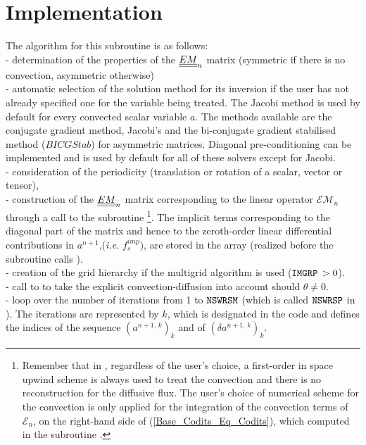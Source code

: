 \section*{Implementation}
The algorithm for this subroutine is as follows:\\
- determination of the properties of the $\underline{\underline{EM}}_{n}$ matrix (symmetric
if there is no convection, asymmetric otherwise)\\
- automatic selection of the solution method for its inversion if the user has not already
specified one for the variable being treated. The Jacobi method is used by default for every convected scalar variable $a$. The  methods available are the conjugate gradient method, Jacobi's and the
bi-conjugate gradient stabilised method ($BICGStab$) for asymmetric matrices.  Diagonal pre-conditioning can be implemented and is used by default for all of these solvers except for Jacobi.\\
- consideration of the periodicity (translation or rotation of a scalar, vector or tensor),\\
- construction of the $\underline{\underline{EM}}_{n}$ matrix corresponding to the linear operator $\mathcal{EM}_{n}$ through a call to the subroutine
\footnote{ Remember that in , regardless of the user's choice, a first-order in space upwind scheme is always used to treat the convection and there is no reconstruction for
the diffusive flux. The user's choice of numerical scheme for the convection is only applied for the integration
of the convection terms of $\mathcal{E}_{n}$, on the right-hand side of
(\ref{Base_Codits_Eq_Codits}), which computed in the subroutine .}. The implicit terms corresponding to the diagonal part of the matrix and hence to the zeroth-order linear differential contributions in $a^{n+1}$,({\it i.e.} $f_s^{imp}$), are stored in the array  (realized before the subroutine calls ).\\
- creation of the grid hierarchy if the multigrid algorithm is used
($ \text{\texttt{IMGRP}}\,>0 $).\\
- call to  to take the explicit convection-diffusion into account should
 $\theta \ne 0$.\\
- loop over the number of iterations from 1 to $\text{\texttt{NSWRSM}}$ (which is called $\text{\texttt{NSWRSP}}$ in ).
The iterations are represented by $k$, which is designated  in the code and defines the indices of the sequence $(a^{n+1,\,k})_k$ and of $(\delta a^{n+1,\,k})_k$.\\
